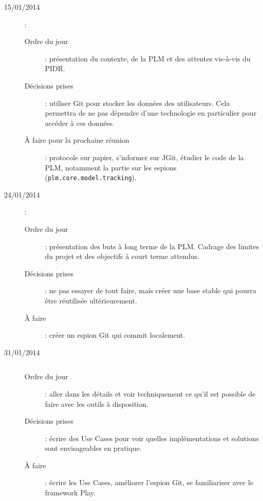 \begin{description}
\item[15/01/2014] : $ $
	\begin{description}
	\item[Ordre du jour] : présentation du contexte, de la PLM et des attentes vis-à-vis du PIDR.
	\item[Décisions prises] : utiliser Git pour stocker les données des utilisateurs. Cela permettra de ne pas dépendre d'une technologie en particulier pour accéder à ces données.
	\item[\`A faire pour la prochaine réunion] : protocole sur papier, s'informer sur JGit, étudier le code de la PLM, notamment la partie sur les espions (\texttt{plm.core.model.tracking}).
	\end{description}
\end{description}

\begin{description}
\item[24/01/2014] : $ $
	\begin{description}
	\item[Ordre du jour] : présentation des buts à long terme de la PLM. Cadrage des limites du projet et des objectifs à court terme attendus.
	\item[Décisions prises] : ne pas essayer de tout faire, mais créer une base stable qui pourra être réutilisée ultérieurement.
	\item[À faire] : créer un espion Git qui commit localement.
	\end{description}
\end{description}

\begin{description}
\item[31/01/2014] $ $
	\begin{description}
	\item[Ordre du jour] : aller dans les détails et voir techniquement ce qu'il est possible de faire avec les outils à disposition.
	\item[Décisions prises] : écrire des Use Cases pour voir quelles implémentations et solutions sont envisageables en pratique.
	\item[À faire] : écrire les Use Cases, améliorer l'espion Git, se familiariser avec le framework Play.
	\end{description}
\end{description}

